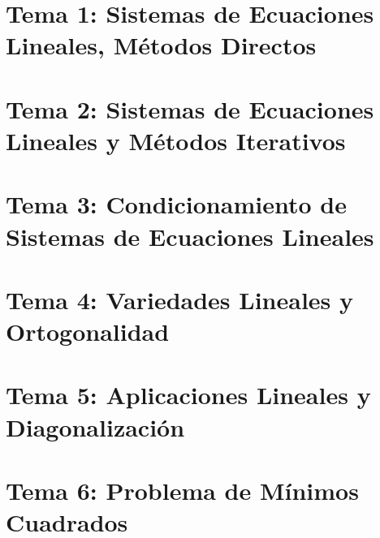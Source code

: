 \renewcommand{\contentsname}{Indice}
\tableofcontents
\newpage
\section{Tema 1: Sistemas de Ecuaciones Lineales, Métodos Directos}

\newpage
\section{Tema 2: Sistemas de Ecuaciones Lineales y Métodos Iterativos}

\newpage
\section{Tema 3: Condicionamiento de Sistemas de Ecuaciones Lineales}

\newpage
\section{Tema 4: Variedades Lineales y Ortogonalidad}

\newpage
\section{Tema 5: Aplicaciones Lineales y Diagonalización}

\newpage
\section{Tema 6: Problema de Mínimos Cuadrados}
